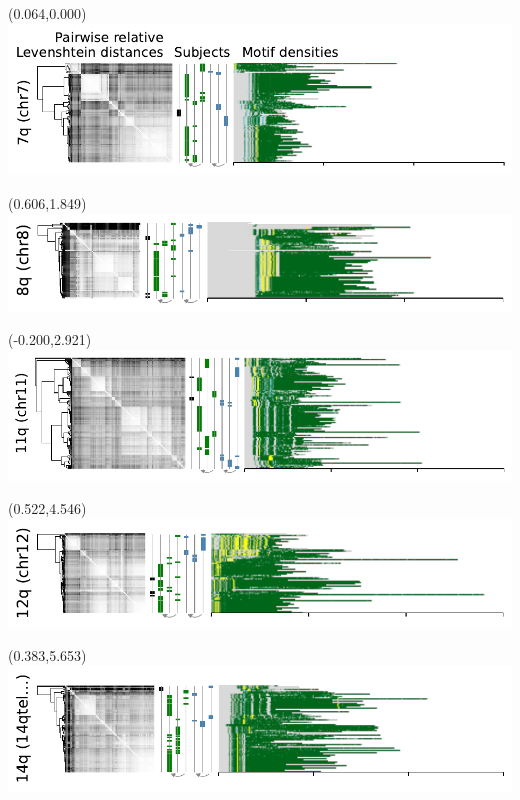 \documentclass{article}
\begin{document}
\begin{textblock}{13}(0.064,0.000)\includegraphics{Figure_5/chr7.pdf}\end{textblock}
\begin{textblock}{13}(0.606,1.849)\includegraphics{Figure_5/chr8.pdf}\end{textblock}
\begin{textblock}{13}(-0.200,2.921)\includegraphics{Figure_5/chr11.pdf}\end{textblock}
\begin{textblock}{13}(0.522,4.546)\includegraphics{Figure_5/chr12.pdf}\end{textblock}
\begin{textblock}{13}(0.383,5.653)\includegraphics{Figure_5/14qtel_1-500K_1_12_12_rc.pdf}\end{textblock}
\end{document}
